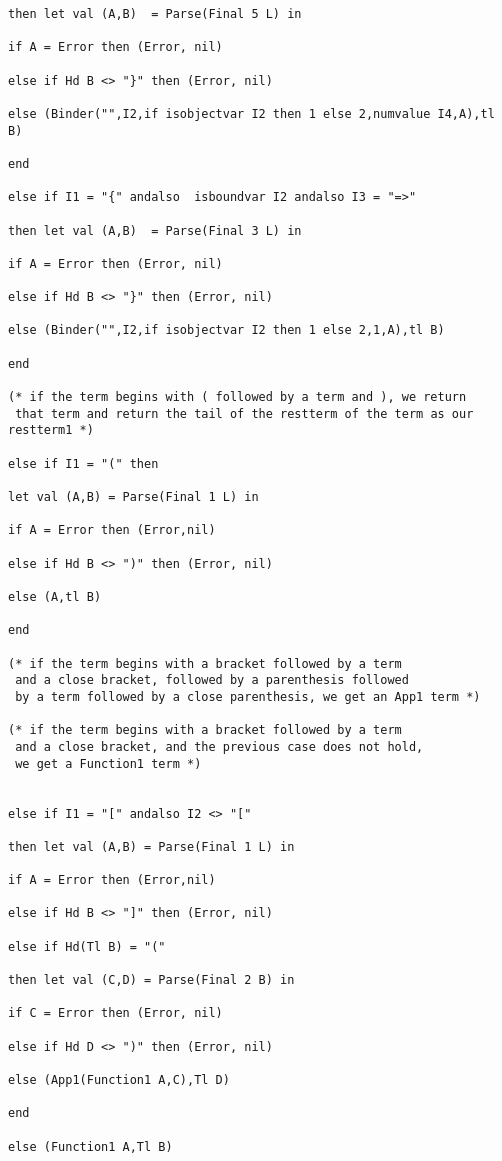 \documentclass{article}
\begin{document}
{{\begin{verbatim}
then let val (A,B)  = Parse(Final 5 L) in

if A = Error then (Error, nil)

else if Hd B <> "}" then (Error, nil)

else (Binder("",I2,if isobjectvar I2 then 1 else 2,numvalue I4,A),tl B)

end

else if I1 = "{" andalso  isboundvar I2 andalso I3 = "=>"

then let val (A,B)  = Parse(Final 3 L) in

if A = Error then (Error, nil)

else if Hd B <> "}" then (Error, nil)

else (Binder("",I2,if isobjectvar I2 then 1 else 2,1,A),tl B)

end

(* if the term begins with ( followed by a term and ), we return
 that term and return the tail of the restterm of the term as our restterm1 *)

else if I1 = "(" then

let val (A,B) = Parse(Final 1 L) in

if A = Error then (Error,nil)

else if Hd B <> ")" then (Error, nil)

else (A,tl B)

end

(* if the term begins with a bracket followed by a term
 and a close bracket, followed by a parenthesis followed
 by a term followed by a close parenthesis, we get an App1 term *)

(* if the term begins with a bracket followed by a term
 and a close bracket, and the previous case does not hold,
 we get a Function1 term *) 


else if I1 = "[" andalso I2 <> "["

then let val (A,B) = Parse(Final 1 L) in

if A = Error then (Error,nil)

else if Hd B <> "]" then (Error, nil)

else if Hd(Tl B) = "("

then let val (C,D) = Parse(Final 2 B) in

if C = Error then (Error, nil)

else if Hd D <> ")" then (Error, nil)

else (App1(Function1 A,C),Tl D)

end

else (Function1 A,Tl B)


\end{verbatim}}}
\end{document}
